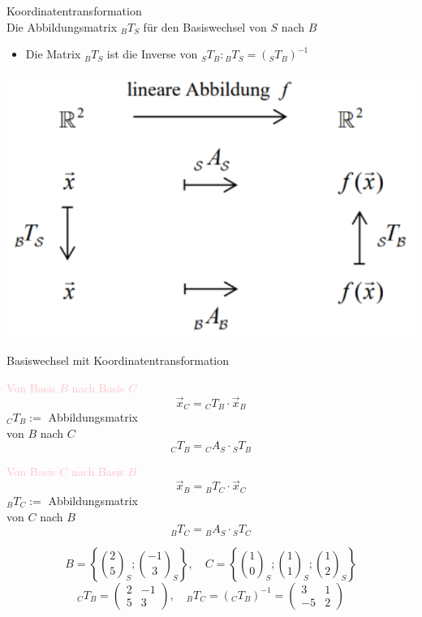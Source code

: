 \begin{concept}{Koordinatentransformation}\\
    Die Abbildungsmatrix ${ }_{B} T_{S}$ für den Basiswechsel von $S$ nach $B$
    \begin{itemize}
    \item Die Matrix ${ }_{B} T_{S}$ ist die Inverse von ${ }_{S} T_{B}:{ }_{B} T_{S}=\left({ }_{S} T_{B}\right)^{-1}$
    \end{itemize}
    \begin{center}
    \includegraphics[width=0.6\linewidth]{images/koordinatentransformation.png}
    \end{center}
\end{concept}

\begin{KR}{Basiswechsel mit Koordinatentransformation}\\
    \begin{minipage}{0.45\linewidth}
        \textcolor{pink}{Von Basis $B$ nach Basis $C$}
        $$
        \vec{x}_{C}={ }_{C} T_{B} \cdot \vec{x}_{B}
        $$
        ${ }_{C} T_{B} :=$ Abbildungsmatrix\\ von $B$ nach $C$
        $${ }_{C} T_{B} = { }_{C} A_{S} \cdot { }_{S} T_{B}$$
    \end{minipage}
    \hspace{3mm}
    \begin{minipage}{0.45\linewidth}
        \textcolor{pink}{Von Basis $C$ nach Basis $B$}
        $$
        \vec{x}_{B}={ }_{B} T_{C} \cdot \vec{x}_{C}
        $$
        ${ }_{B} T_{C} :=$ Abbildungsmatrix\\ von $C$ nach $B$
        $${ }_{B} T_{C} = { }_{B} A_{S} \cdot { }_{S} T_{C}$$
    \end{minipage}
\end{KR}

\begin{example}
    $$
    B=\left\{\binom{2}{5}_{S} ;\binom{-1}{3}_{S}\right\}, \quad C=\left\{\binom{1}{0}_{S} ;\binom{1}{1}_{S} ;\binom{1}{2}_{S}\right\}
    $$
    $$
    { }_{C} T_{B}=\left(\begin{array}{cc}
    2 & -1 \\
    5 & 3
    \end{array}\right), \quad { }_{B} T_{C}=\left({ }_{C} T_{B}\right)^{-1}=\left(\begin{array}{cc}
    3 & 1 \\
    -5 & 2
    \end{array}\right)
    $$
\end{example}


